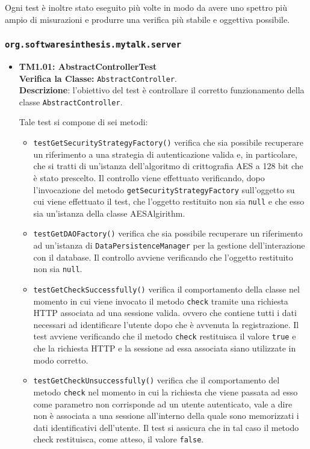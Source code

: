 Ogni test è inoltre stato eseguito più volte in modo da avere uno spettro più ampio di misurazioni e produrre una verifica più stabile e oggettiva possibile.


\subsubsection{\texttt{org.softwaresinthesis.mytalk.server}}
\begin{itemize}

\item \textbf{TM1.01: AbstractControllerTest}\\
\textbf{Verifica la Classe:} \texttt{AbstractController}.\\
\textbf{Descrizione}: l'obiettivo del test è controllare il corretto funzionamento della classe \texttt{AbstractController}.
 
Tale test si compone di sei metodi:
 \begin{itemize}
 
\item \texttt{testGetSecurityStrategyFactory()} verifica che sia possibile recuperare un riferimento a una strategia di autenticazione valida e, in particolare, che si tratti di un'istanza dell'algoritmo di crittografia AES a 128 bit che è stato prescelto. Il controllo viene effettuato verificando, dopo l'invocazione del metodo \texttt{getSecurityStrategyFactory} sull'oggetto su cui viene effettuato il test, che l'oggetto restituito non sia \texttt{null} e che esso sia un'istanza della classe AESAlgirithm.

\item \texttt{testGetDAOFactory()} verifica che sia possibile recuperare un riferimento ad un'istanza di \texttt{DataPersistenceManager} per la gestione dell'interazione con il database. Il controllo avviene verificando che l'oggetto restituito non sia \texttt{null}.

\item \texttt{testGetCheckSuccessfully()} verifica il comportamento della classe nel momento in cui viene invocato il metodo \texttt{check} tramite una richiesta HTTP associata ad una sessione valida. ovvero che contiene tutti i dati necessari ad identificare l'utente dopo che è avvenuta la registrazione. Il test avviene verificando che il metodo \texttt{check} restituisca il valore \texttt{true} e che la richiesta HTTP e la sessione ad essa associata siano utilizzate in modo corretto.

\item \texttt{testGetCheckUnsuccessfully()} verifica che il comportamento del metodo \texttt{check} nel momento in cui la richiesta che viene passata ad esso come parametro non corrisponde ad un utente autenticato, vale a dire non è associata a una sessione all'interno della quale sono memorizzati i dati identificativi dell'utente. Il test si assicura che in tal caso il metodo check restituisca, come atteso, il valore \texttt{false}.


\end{itemize}
\end{itemize}
